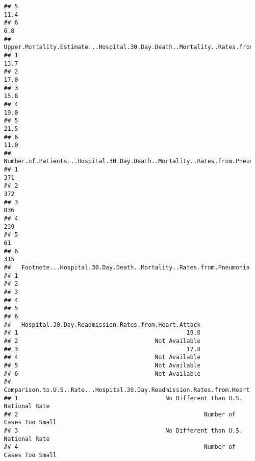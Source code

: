 \documentclass[]{article}
\begin{document}
\begin{verbatim}
## 5                                                                              11.4
## 6                                                                               6.8
##   Upper.Mortality.Estimate...Hospital.30.Day.Death..Mortality..Rates.from.Pneumonia
## 1                                                                              13.7
## 2                                                                              17.0
## 3                                                                              15.8
## 4                                                                              19.0
## 5                                                                              21.5
## 6                                                                              11.0
##   Number.of.Patients...Hospital.30.Day.Death..Mortality..Rates.from.Pneumonia
## 1                                                                         371
## 2                                                                         372
## 3                                                                         836
## 4                                                                         239
## 5                                                                          61
## 6                                                                         315
##   Footnote...Hospital.30.Day.Death..Mortality..Rates.from.Pneumonia
## 1                                                                  
## 2                                                                  
## 3                                                                  
## 4                                                                  
## 5                                                                  
## 6                                                                  
##   Hospital.30.Day.Readmission.Rates.from.Heart.Attack
## 1                                                19.0
## 2                                       Not Available
## 3                                                17.8
## 4                                       Not Available
## 5                                       Not Available
## 6                                       Not Available
##   Comparison.to.U.S..Rate...Hospital.30.Day.Readmission.Rates.from.Heart.Attack
## 1                                          No Different than U.S. National Rate
## 2                                                     Number of Cases Too Small
## 3                                          No Different than U.S. National Rate
## 4                                                     Number of Cases Too Small

\end{verbatim}
\end{document}
